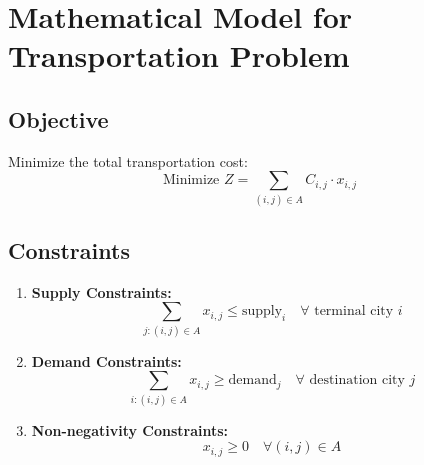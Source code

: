 \documentclass{article}
\begin{document}
\section*{Mathematical Model for Transportation Problem}

\subsection*{Objective}
Minimize the total transportation cost:
\[
\text{Minimize } Z = \sum_{(i,j) \in A} C_{i,j} \cdot x_{i,j}
\]

\subsection*{Constraints}

\begin{enumerate}
    \item \textbf{Supply Constraints:}
    \[
    \sum_{j: (i,j) \in A} x_{i,j} \leq \text{supply}_i \quad \forall \text{ terminal city } i
    \]

    \item \textbf{Demand Constraints:}
    \[
    \sum_{i: (i,j) \in A} x_{i,j} \geq \text{demand}_j \quad \forall \text{ destination city } j
    \]

    \item \textbf{Non-negativity Constraints:}
    \[
    x_{i,j} \geq 0 \quad \forall (i,j) \in A
    \]
\end{enumerate}
\end{document}
